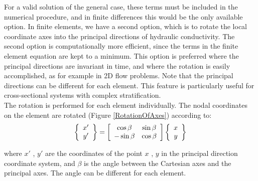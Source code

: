 For a valid solution of the general case, these terms must be included in the numerical procedure, and in finite differences this would be the only available option. In finite elements, we have a second option, which is to rotate the local coordinate axes into the principal directions of hydraulic conductivity. The second option is computationally more efficient, since the terms in the finite element equation are kept to a minimum. This option is preferred where the principal directions are invariant in time, and where the rotation is easily accomplished, as for example in 2D flow problems. Note that the principal directions can be different for each element. This feature is particularly useful for cross-sectional systems with complex stratification. \\
The rotation is performed for each element individually. The nodal coordinates on the element are rotated (Figure \ref{RotationOfAxes}) according to:
\begin{eqnarray}
    \left\{ {\begin{array}{*{20}c}
   {x'}  \\
   {y'}  \\
\end{array}} \right\} = \left[ {\begin{array}{*{20}c}
   {\cos \beta } & {\sin \beta }  \\
   { - \sin \beta } & {\cos \beta }  \\
\end{array}} \right]\left\{ {\begin{array}{*{20}c}
   x  \\
   y  \\
\end{array}} \right\}
\end{eqnarray}

where  $x'$ , $y'$ are the coordinates of the point  $x$ , $y$ in the principal direction coordinate system, and  $\beta $ is the angle between the Cartesian axes and the principal axes. The angle can be different for each element.

